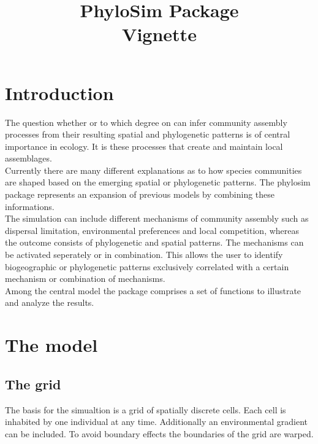 \documentclass [a4paper]{tufte-book}\usepackage[]{graphicx}\usepackage[]{color}
\title{PhyloSim Package\\ Vignette}
\author{}
\begin{document}
\maketitle
\tableofcontents
\chapter{Introduction}
The question whether or to which degree on can infer community assembly processes from their resulting spatial and phylogenetic patterns is of central importance in ecology. It is these processes that create and maintain local assemblages.\\
Currently there are many different explanations as to how species communities are shaped based on the emerging spatial or phylogenetic patterns. 
The phylosim package represents an expansion of previous models by combining these informations.\\
The simulation can include different mechanisms of community assembly such as dispersal limitation, environmental preferences and local competition, whereas the outcome consists of phylogenetic and spatial patterns. The mechanisms can be activated seperately or in combination. This allows the user to identify biogeographic or phylogenetic patterns exclusively correlated with a certain mechanism or combination of mechanisms.\\
Among the central model the package comprises a set of functions to illustrate and analyze the results.


\chapter{The model}
\section{The grid}
The basis for the simualtion is a grid of spatially discrete cells.
Each cell is inhabited by one individual at any time. Additionally an environmental gradient can be included. To avoid boundary effects the boundaries of the grid are warped.
\end{document}
